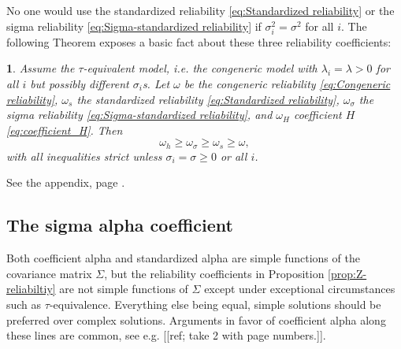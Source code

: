 \documentclass{article}
\makeatletter
\theoremstyle{plain}
\theoremstyle{plain}
\theoremstyle{definition}
\theoremstyle{remark}
\theoremstyle{definition}
\theoremstyle{plain}
\theoremstyle{plain}
\newtheorem{prop}[thm]{\protect\propositionname}
\theoremstyle{definition}
\newenvironment{proof}[1][\protect\proofname]{\par
	\normalfont\topsep6\p@\@plus6\p@\relax
	\trivlist
	\itemindent\parindent
	\item[\hskip\labelsep\scshape #1]\ignorespaces
}{%
	\endtrivlist\@endpefalse
}
\providecommand{\proofname}{Proof}
\providecommand{\propositionname}{Proposition}
\makeatother
\begin{document}
No one would use the standardized reliability \ref{eq:Standardized reliability}
or the sigma reliability \eqref{eq:Sigma-standardized reliability}
if $\sigma_{i}^{2}=\sigma^{2}$ for all $i$. The following Theorem
exposes a basic fact about these three reliability coefficients:
\begin{prop}
\label{prop:Properties of three} Assume the $\tau$-equivalent model,
i.e. the congeneric model with $\lambda_{i}=\lambda>0$ for all $i$
but possibly different $\sigma_{i}$s. Let $\omega$ be the congeneric
reliability \eqref{eq:Congeneric reliability}, $\omega_{s}$ the standardized reliability \eqref{eq:Standardized reliability},
$\omega_{\sigma}$ the sigma reliability \eqref{eq:Sigma-standardized reliability},
and $\omega_{H}$ coefficient $H$ \eqref{eq:coefficient_H}. Then
\[
\omega_{h}\geq\omega_{\sigma}\geq\omega_{s}\geq\omega,
\]
with all inequalities strict unless $\sigma_{i}=\sigma\geq0$ or all
$i$.
\end{prop}
\begin{proof}
See the appendix, page \pageref{proof:Properties}.
\end{proof}



\subsection{The sigma alpha coefficient}
Both coefficient alpha and standardized alpha are simple functions
of the covariance matrix $\Sigma$, but the reliability coefficients
in Proposition \ref{prop:Z-reliabiltiy} are not simple functions
of $\Sigma$ except under exceptional circumstances such as $\tau$-equivalence.
Everything else being equal, simple solutions should be preferred
over complex solutions. Arguments in favor of coefficient alpha along
these lines are common, see e.g. {[}{[}ref; take 2 with page numbers.{]}{]}.
\end{document}
